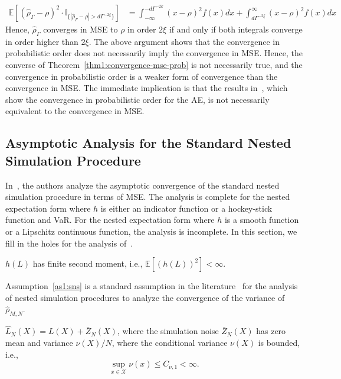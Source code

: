\begin{align*}
    \mathbb{E} \left[ \left(\hat{\rho}_{\Gamma} - \rho\right)^2 \cdot \mathbb{I}_{\{|\hat{\rho}_{\Gamma} - \rho| > d\Gamma^{-2\xi}\}} \right] 
    & = \int_{-\infty}^{-d\Gamma^{-2k}} (x - \rho)^2 f(x) dx + \int_{d\Gamma^{-2\xi}}^{\infty} (x - \rho)^2 f(x) dx 
\end{align*}
Hence, $\hat{\rho}_{\Gamma}$ converges in MSE to $\rho$ in order $2\xi$ if and only if both integrals converge in order higher than $2\xi$. 
The above argument shows that the convergence in probabilistic order does not necessarily imply the convergence in MSE.
Hence, the converse of Theorem~\ref{thm1:convergence-mse-prob} is not necessarily true, and the convergence in probabilistic order is a weaker form of convergence than the convergence in MSE.
The immediate implication is that the results in~\cite{wang2022smooth}, which show the convergence in probabilistic order for the AE, is not necessarily equivalent to the convergence in MSE.

\subsection{Asymptotic Analysis for the Standard Nested Simulation Procedure} \label{sec1:sns}
In~\cite{gordy2010nested}, the authors analyze the asymptotic convergence of the standard nested simulation procedure in terms of MSE. 
The analysis is complete for the nested expectation form where $h$ is either an indicator function or a hockey-stick function and VaR. 
For the nested expectation form where $h$ is a smooth function or a Lipschitz continuous function, the analysis is incomplete.
In this section, we fill in the holes for the analysis of~\cite{gordy2010nested}.

\begin{assumption} \label{as1:sns}
    $h(L)$ has finite second moment, i.e., $\mathbb{E} \left[ \left( h(L) \right)^2 \right] < \infty$.
\end{assumption}

Assumption~\ref{as1:sns} is a standard assumption in the literature~\citep{hong2017kernel} for the analysis of nested simulation procedures to analyze the convergence of the variance of $\hat{\rho}_{M, N}$.

\begin{assumption} \label{as1:sns-noise}
    $\hat{L}_N(X) = L(X) + \bar{Z}_N(X)$, where the simulation noise $\bar{Z}_N(X)$ has zero mean and variance $\nu(X) / N$, where the conditional variance $\nu(X)$ is bounded, i.e., 
    $$
        \sup_{x \in \mathcal{X}} \nu(x) \leq C_{\nu, 1} < \infty.
    $$
\end{assumption}

